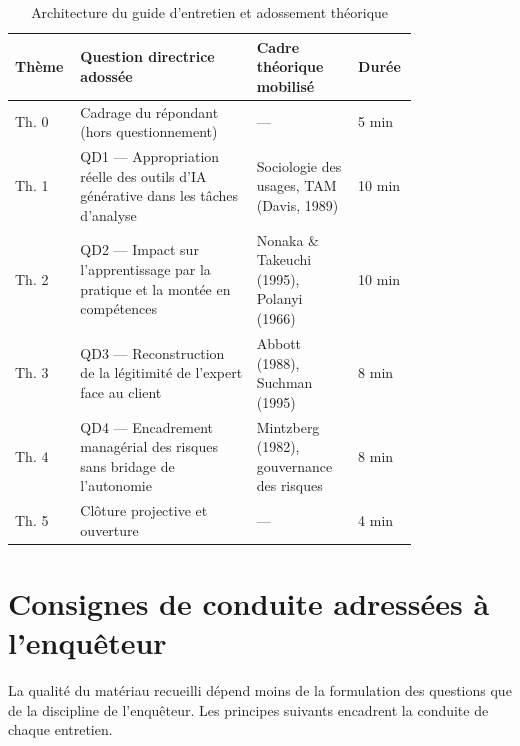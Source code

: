 \begin{table}[h]
\centering
\small
\begin{tabular}{|p{0.08\linewidth}|p{0.40\linewidth}|p{0.23\linewidth}|p{0.09\linewidth}|}
\hline
\textbf{Thème} & \textbf{Question directrice adossée} & \textbf{Cadre théorique mobilisé} & \textbf{Durée} \\
\hline
Th. 0 & Cadrage du répondant (hors questionnement) & --- & 5 min \\
\hline
Th. 1 & QD1 --- Appropriation réelle des outils d'IA générative dans les tâches d'analyse & Sociologie des usages, TAM (Davis, 1989) & 10 min \\
\hline
Th. 2 & QD2 --- Impact sur l'apprentissage par la pratique et la montée en compétences & Nonaka \& Takeuchi (1995), Polanyi (1966) & 10 min \\
\hline
Th. 3 & QD3 --- Reconstruction de la légitimité de l'expert face au client & Abbott (1988), Suchman (1995) & 8 min \\
\hline
Th. 4 & QD4 --- Encadrement managérial des risques sans bridage de l'autonomie & Mintzberg (1982), gouvernance des risques & 8 min \\
\hline
Th. 5 & Clôture projective et ouverture & --- & 4 min \\
\hline
\end{tabular}
\caption{Architecture du guide d'entretien et adossement théorique}
\label{tab:architecture-guide}
\end{table}

\section{Consignes de conduite adressées à l'enquêteur}

La qualité du matériau recueilli dépend moins de la formulation des questions que de
la discipline de l'enquêteur. Les principes suivants encadrent la conduite de chaque
entretien.

